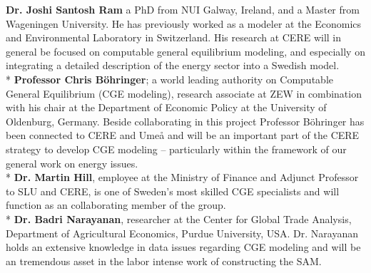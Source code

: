\documentclass[10pt,a4paper]{article}
\begin{document}
\textbf{Dr. Joshi Santosh Ram} a PhD from NUI Galway, Ireland, and a Master from Wageningen University. He has previously worked as a modeler at the Economics and Environmental Laboratory in Switzerland. His research at CERE will in general be focused on computable general equilibrium modeling, and especially on integrating a detailed description of the energy sector into a Swedish model.\\*
\textbf{Professor Chris Böhringer}; a world leading authority on Computable General Equilibrium (CGE modeling), research associate at ZEW in combination with his chair at the Department of Economic Policy at the University of Oldenburg, Germany. Beside collaborating in this project Professor Böhringer has been connected to CERE and Umeå and will be an important part of the CERE strategy to develop CGE modeling – particularly within the framework of our general work on energy issues.\\*
\textbf{Dr. Martin Hill}, employee at the Ministry of Finance and Adjunct Professor to SLU and CERE, is one of Sweden's most skilled CGE specialists and will function as an collaborating member of the group.\\*
\textbf{Dr. Badri Narayanan}, researcher at the Center for Global Trade Analysis, Department of Agricultural Economics, Purdue University, USA. Dr. Narayanan holds an extensive knowledge in data issues regarding CGE modeling and will be an tremendous asset in the labor intense work of constructing the SAM.\\\\
\begin{comment}
The efficient implementation of the project requires proper organisation. Two researcher engaged in the project will have regular meeting to ensure that purpose and aim of the project are going in right direction with the supervision of the team leader. Meeting with the international expert who are experts on this field will guarantee that the research work is of international standard with scientific quality and policy relevance.
\end{comment}

\vspace{1cm}

\end{document}
